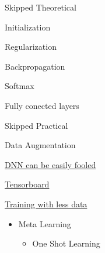 \documentclass[12pt,t]{beamer}
\begin{document}
\begin{frame}[c]{Skipped Theoretical}

Initialization

Regularization

Backpropagation

Softmax

Fully conected layers

\end{frame}

\begin{frame}[c]{Skipped Practical}

Data Augmentation

\href{https://arxiv.org/pdf/1412.1897.pdf}{DNN can be easily fooled}

\href{https://www.tensorflow.org/get_started/summaries_and_tensorboard}{Tensorboard}

\href{http://proceedings.mlr.press/v48/santoro16.pdf}{Training with less data }
\begin{itemize}
\item Meta Learning
	\begin{itemize} 
	\item One Shot Learning
	\end{itemize}
\end{itemize}

\end{frame}
\end{document}
